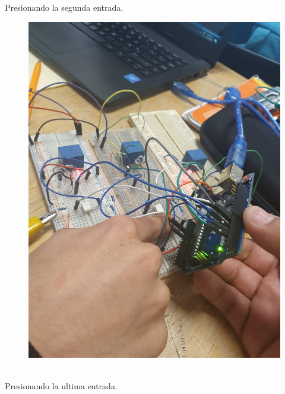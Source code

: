 \documentclass[10pt,a4paper]{article}
\begin{document}
Presionando la segunda entrada.
\begin{figure}[hbtp]
\centering
\includegraphics[scale=0.27]{004.png} 
\end{figure}\\
Presionando la ultima entrada.
\end{document}
